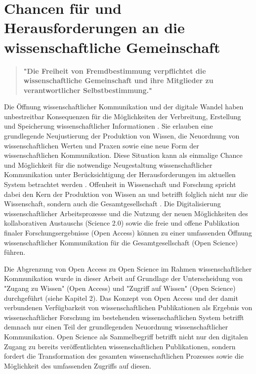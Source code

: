 \section{Chancen für und Herausforderungen an die wissenschaftliche Gemeinschaft}

\begin{quote}
\textbf{"Die Freiheit von Fremdbestimmung verpflichtet die wissenschaftliche Gemeinschaft und ihre Mitglieder zu verantwortlicher Selbstbestimmung."}
\end{quote} \cite[:69]{Oezmen_2015}

Die Öffnung wissenschaftlicher Kommunikation und der digitale Wandel haben unbestreitbar Konsequenzen für die Möglichkeiten der Verbreitung, Erstellung und Speicherung wissenschaftlicher Informationen \cite[:233]{Gould_2009}. Sie erlauben eine grundlegende Neujustierung der Produktion von Wissen, die Neuordnung von wissenschaftlichen Werten und Praxen sowie eine neue Form der wissenschaftlichen Kommunikation. Diese Situation kann als einmalige Chance und Möglichkeit für die notwendige Neugestaltung wissenschaftlicher Kommunikation unter Berücksichtigung der Herausforderungen im aktuellen System betrachtet werden \cite{Naeder_2010}. Offenheit in Wissenschaft und Forschung spricht dabei den Kern der Produktion von Wissen an und betrifft folglich nicht nur die Wissenschaft, sondern auch die Gesamtgesellschaft \cite{Mussell_2013}. Die Digitalisierung wissenschaftlicher Arbeitsprozesse und die Nutzung der neuen Möglichkeiten des kollaborativen Austauschs (Science 2.0) sowie die freie und offene Publikation finaler Forschungsergebnisse (Open Access) können zu einer umfassenden Öffnung wissenschaftlicher Kommunikation für die Gesamtgesellschaft (Open Science) führen.

Die Abgrenzung von Open Access zu Open Science im Rahmen wissenschaftlicher Kommunikation wurde in dieser Arbeit auf Grundlage der Unterscheidung von "Zugang zu Wissen" (Open Access) und "Zugriff auf Wissen" (Open Science) durchgeführt (siehe Kapitel 2). Das Konzept von Open Access und der damit verbundenen Verfügbarkeit von wissenschaftlichen Publikationen als Ergebnis von wissenschaftlicher Forschung im bestehenden wissenschaftlichen System betrifft demnach nur einen Teil der grundlegenden Neuordnung wissenschaftlicher Kommunikation. Open Science als Sammelbegriff betrifft nicht nur den digitalen Zugang zu bereits veröffentlichten wissenschaftlichen Publikationen, sondern fordert die Transformation des gesamten wissenschaftlichen Prozesses sowie die Möglichkeit des umfassenden Zugriffs auf diesen.

